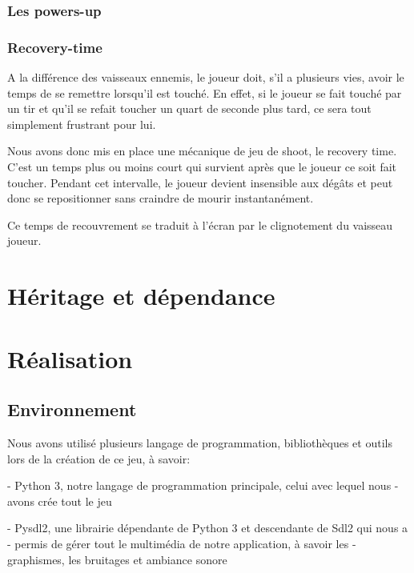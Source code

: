 \documentclass{article}
\begin{document}
\subsubsection{Les powers-up}

\subsubsection{Recovery-time}

A la différence des vaisseaux ennemis, le joueur doit, s'il a plusieurs vies,
avoir le temps de se remettre lorsqu'il est touché. En effet, si le joueur se
fait touché par un tir et qu'il se refait toucher un quart de seconde plus tard,
ce sera tout simplement frustrant pour lui. \newline

Nous avons donc mis en place une mécanique de jeu de shoot, le recovery time.
C'est un temps plus ou moins court qui survient après que le joueur ce soit fait
toucher. Pendant cet intervalle, le joueur devient insensible aux dégâts et peut
donc se repositionner sans craindre de mourir instantanément. \newline

Ce temps de recouvrement se traduit à l'écran par le clignotement du vaisseau
joueur. \newpage

\section{Héritage et dépendance}


\newpage

\section{Réalisation}

\subsection{Environnement}

Nous avons utilisé plusieurs langage de programmation, bibliothèques et outils
lors de la création de ce jeu, à savoir: \newline

- Python 3, notre langage de programmation principale, celui avec lequel nous
- avons crée tout le jeu \newline

- Pysdl2, une librairie dépendante de Python 3 et descendante de Sdl2 qui nous a
- permis de gérer tout le multimédia de notre application, à savoir les
- graphismes, les bruitages et ambiance sonore \newline
\end{document}
